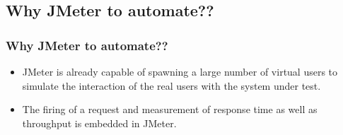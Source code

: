 \documentclass[12pt]{beamer}
\begin{document}
\subsection{Why JMeter to automate??}
\begin{frame}[c]
\frametitle{Why JMeter to automate??}
\begin{itemize}
 \item<+-| alert@+>JMeter is already capable of spawning a large number of virtual users to simulate the interaction of the real users with the system under test.
 \item<+-| alert@+>The firing of a request and measurement of response time as well as throughput is embedded in JMeter.
\end{itemize}

\end{frame}

\end{document}
